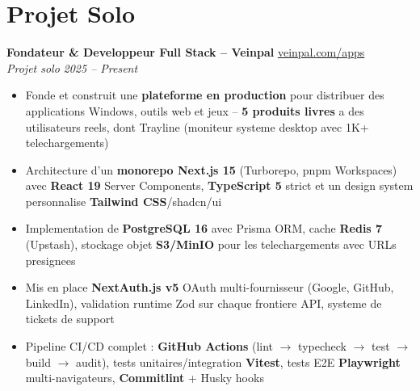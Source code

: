 \documentclass[10pt,a4paper]{article}
\begin{document}
\section*{Projet Solo}
{\small
\textbf{Fondateur \& Developpeur Full Stack -- Veinpal} \hfill \href{https://veinpal.com/apps}{veinpal.com/apps}\\[1pt]
\textit{Projet solo} \hfill \textit{2025 -- Present}
\begin{itemize}
  \item Fonde et construit une \textbf{plateforme en production} pour distribuer des applications Windows, outils web et jeux -- \textbf{5 produits livres} a des utilisateurs reels, dont Trayline (moniteur systeme desktop avec 1K+ telechargements)
  \item Architecture d'un \textbf{monorepo Next.js 15} (Turborepo, pnpm Workspaces) avec \textbf{React 19} Server Components, \textbf{TypeScript 5} strict et un design system personnalise \textbf{Tailwind CSS}/shadcn/ui
  \item Implementation de \textbf{PostgreSQL 16} avec Prisma ORM, cache \textbf{Redis 7} (Upstash), stockage objet \textbf{S3/MinIO} pour les telechargements avec URLs presignees
  \item Mis en place \textbf{NextAuth.js v5} OAuth multi-fournisseur (Google, GitHub, LinkedIn), validation runtime Zod sur chaque frontiere API, systeme de tickets de support
  \item Pipeline CI/CD complet : \textbf{GitHub Actions} (lint $\rightarrow$ typecheck $\rightarrow$ test $\rightarrow$ build $\rightarrow$ audit), tests unitaires/integration \textbf{Vitest}, tests E2E \textbf{Playwright} multi-navigateurs, \textbf{Commitlint} + Husky hooks
\end{itemize}
}

\end{document}
